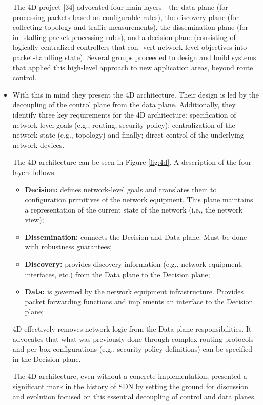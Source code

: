 \documentclass[12pt,openright,twoside]{report}
\begin{document}
\begin{itemize}
The 4D project [34] advocated four main layers—the data plane (for processing packets based on configurable rules), the discovery plane (for collecting topology and traffic measurements), the dissemination plane (for in- stalling packet-processing rules), and a decision plane (consisting of logically centralized controllers that con- vert network-level objectives into packet-handling state). Several groups proceeded to design and build systems that applied this high-level approach to new application areas, beyond route control.


\item  With this in mind they present the  4D architecture. Their  design is led by the
decoupling of the control plane from the data plane. Additionally, they
identify three key requirements for the 4D architecture: specification of  network level goals (e.g., routing,
security policy);  centralization of the network state (e.g.,
topology) and finally; direct control of the underlying network
devices.

The 4D architecture can be seen
in Figure \ref{fig:4d}. A description of the four layers
follows: 


\begin{itemize}
\item[] \textbf{Decision:}  defines network-level goals and 
  translates them to configuration primitives of the network
  equipment. This plane maintains a representation of the current state of the network (i.e., the network view); 
\item[] \textbf{Dissemination:}  connects the Decision and Data plane. Must be
  done with robustness guarantees; 
\item[] \textbf{Discovery:} provides discovery information (e.g., network
  equipment, interfaces, etc.) from the Data plane to the Decision plane; 
\item[] \textbf{Data:}  is governed by the network equipment
  infrastructure. Provides packet forwarding functions and implements
  an interface to the Decision plane;  
\end{itemize}

4D effectively removes network logic  from the Data plane
responsibilities. It advocates that what was previously done through complex
routing protocols and per-box configurations (e.g., security policy
definitions)  can be specified in the Decision plane. 

The 4D architecture, even without a concrete implementation, 
presented a significant mark in the history of SDN by setting the
ground for discussion and evolution focused on this essential
decoupling of control and data planes.  



\end{itemize}
\end{document}
